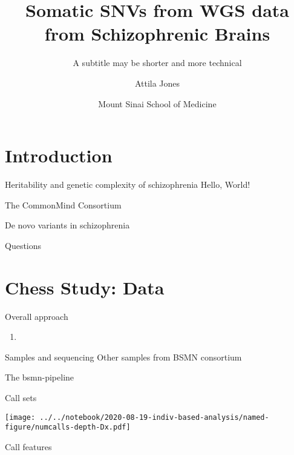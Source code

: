 \documentclass{beamer}
\title{Somatic SNVs from WGS data from Schizophrenic Brains}
\subtitle{A subtitle may be shorter and more technical}
\author{Attila Jones}
\date{Mount Sinai School of Medicine}
\begin{document}
\maketitle

\section{Introduction}

\begin{frame}{Heritability and genetic complexity of schizophrenia}
	Hello, World!
\end{frame}

\begin{frame}{The CommonMind Consortium}

\end{frame}

\begin{frame}{De novo variants in schizophrenia}

\end{frame}

\begin{frame}{Questions}

\end{frame}

\section{Chess Study: Data}

\begin{frame}{Overall approach}
	\begin{enumerate}
		\item
	\end{enumerate}
\end{frame}

\begin{frame}{Samples and sequencing}
Other samples from BSMN consortium
\end{frame}

\begin{frame}{The bsmn-pipeline}

\end{frame}

\begin{frame}[label=numcalls-depth]{Call sets}

\texttt{[image: ../../notebook/2020-08-19-indiv-based-analysis/named-figure/numcalls-depth-Dx.pdf]}
\end{frame}

\begin{frame}{Call features}

\end{frame}
\end{document}

